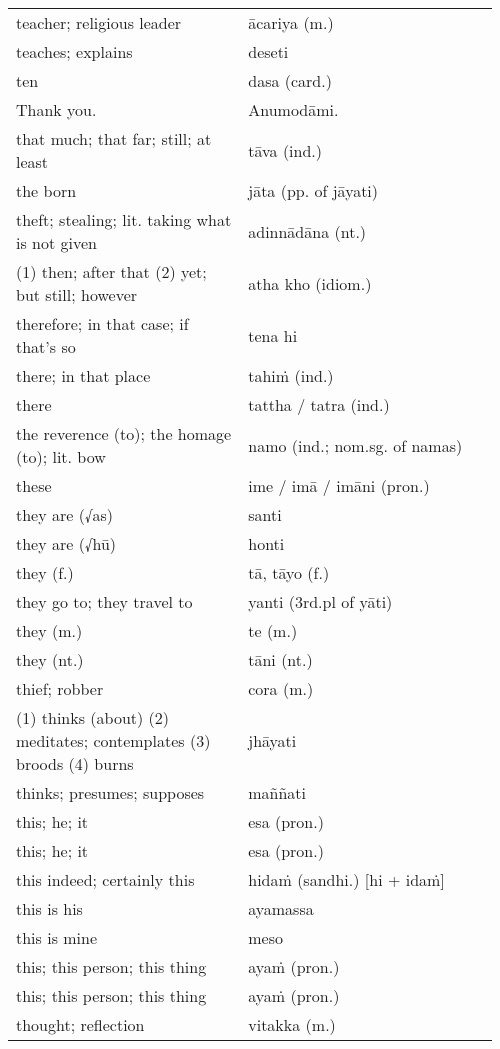 \documentclass[a5paper]{memoir}
\begin{document}
\begin{longtable}{L{0.48\linewidth} L{0.48\linewidth} H}
teacher; religious leader & ācariya (m.) & \\[0pt]
teaches; explains & deseti & \\[0pt]
ten & dasa (card.) & \\[0pt]
Thank you. & Anumodāmi. & \\[0pt]
that much; that far; still; at least & tāva (ind.) & \\[0pt]
the born & jāta (pp. of jāyati) & \\[0pt]
theft; stealing; lit. taking what is not given & adinnādāna (nt.) & \\[0pt]
(1) then; after that (2) yet; but still; however & atha kho (idiom.) & \\[0pt]
therefore; in that case; if that's so & tena hi & \\[0pt]
there; in that place & tahiṁ (ind.) & \\[0pt]
there & tattha / tatra (ind.) & \\[0pt]
the reverence (to); the homage (to); lit. bow & namo (ind.; nom.sg. of namas) & \\[0pt]
these & ime / imā / imāni (pron.) & \\[0pt]
they are (√as) & santi & \\[0pt]
they are (√hū) & honti & \\[0pt]
they (f.) & tā, tāyo (f.) & \\[0pt]
they go to; they travel to & yanti (3rd.pl of yāti) & \\[0pt]
they (m.) & te (m.) & \\[0pt]
they (nt.) & tāni (nt.) & \\[0pt]
thief; robber & cora (m.) & \\[0pt]
(1) thinks (about) (2) meditates; contemplates (3) broods (4) burns & jhāyati & \\[0pt]
thinks; presumes; supposes & maññati & \\[0pt]
this; he; it & esa (pron.) & \\[0pt]
this; he; it & esa (pron.) & \\[0pt]
this indeed; certainly this & hidaṁ (sandhi.) [hi + idaṁ] & \\[0pt]
this is his & ayamassa & \\[0pt]
this is mine & meso & \\[0pt]
this; this person; this thing & ayaṁ (pron.) & \\[0pt]
this; this person; this thing & ayaṁ (pron.) & \\[0pt]
thought; reflection & vitakka (m.) & \\[0pt]

\end{longtable}
\end{document}
